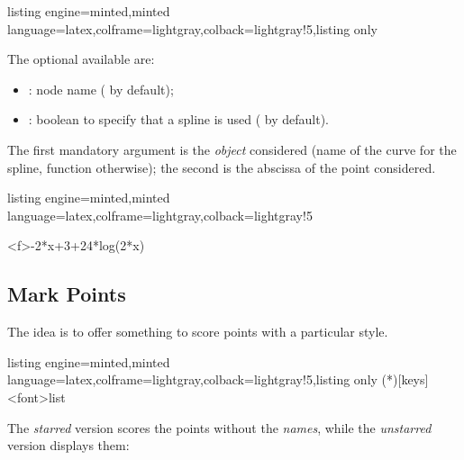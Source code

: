 \documentclass[11pt,a4paper]{ltxdoc}
\begin{document}
\begin{tcblisting}{listing engine=minted,minted language=latex,colframe=lightgray,colback=lightgray!5,listing only}
\end{tcblisting}

The optional \MontreCode{[keys]} available are:

\smallskip

\begin{itemize}
	\item {}: node name ( by default);
	\item {}: boolean to specify that a spline is used ( by default).
\end{itemize}

The first mandatory argument is the \textit{object} considered (name of the curve for the spline, function otherwise); the second is the abscissa of the point considered.

\begin{tcblisting}{listing engine=minted,minted language=latex,colframe=lightgray,colback=lightgray!5}
\begin{GraphTikz}%
	[x=0.9cm,y=0.425cm,Xmin=4,Xmax=20,Origx=4,
	Ymin=40,Ymax=56,Ygrid=2,Ygrids=1,Origy=40]
	{-2*x+3+24*log(2*x)}
\end{GraphTikz}
\end{tcblisting}

\pagebreak

\subsection{Mark Points}\label{markpts}

The idea is to offer something to score points with a particular style.

\begin{tcblisting}{listing engine=minted,minted language=latex,colframe=lightgray,colback=lightgray!5,listing only}
\MarkPts(*)[keys]<font>{list}
\end{tcblisting}

The \textit{starred} version scores the points without the \textit{names}, while the \textit{unstarred} version displays them:
\end{document}

